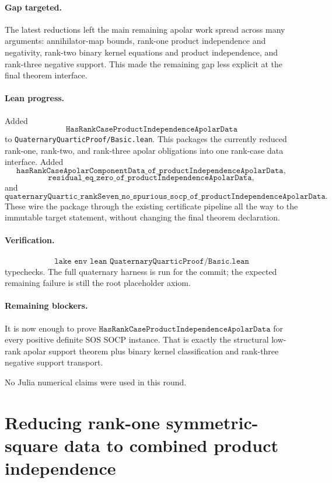 \documentclass[11pt]{article}
\begin{document}
\paragraph{Gap targeted.}
The latest reductions left the main remaining apolar work spread across many
arguments: annihilator-map bounds, rank-one product independence and
negativity, rank-two binary kernel equations and product independence, and
rank-three negative support.  This made the remaining gap less explicit at the
final theorem interface.

\paragraph{Lean progress.}
Added
\[
\texttt{HasRankCaseProductIndependenceApolarData}
\]
to \texttt{QuaternaryQuarticProof/Basic.lean}.  This packages the currently
reduced rank-one, rank-two, and rank-three apolar obligations into one
rank-case data interface.  Added
\[
\texttt{hasRankCaseApolarComponentData\_of\_productIndependenceApolarData},
\]
\[
\texttt{residual\_eq\_zero\_of\_productIndependenceApolarData},
\]
and
\[
\texttt{quaternaryQuartic\_rankSeven\_no\_spurious\_socp\_of\_productIndependenceApolarData}.
\]
These wire the package through the existing certificate pipeline all the way
to the immutable target statement, without changing the final theorem
declaration.

\paragraph{Verification.}
\[
\texttt{lake env lean QuaternaryQuarticProof/Basic.lean}
\]
typechecks.  The full quaternary harness is run for the commit; the expected
remaining failure is still the root placeholder axiom.

\paragraph{Remaining blockers.}
It is now enough to prove
\(\texttt{HasRankCaseProductIndependenceApolarData}\) for every positive
definite SOS SOCP instance.  That is exactly the structural low-rank apolar
support theorem plus binary kernel classification and rank-three negative
support transport.

No Julia numerical claims were used in this round.

\section*{Reducing rank-one symmetric-square data to combined product independence}
\end{document}
